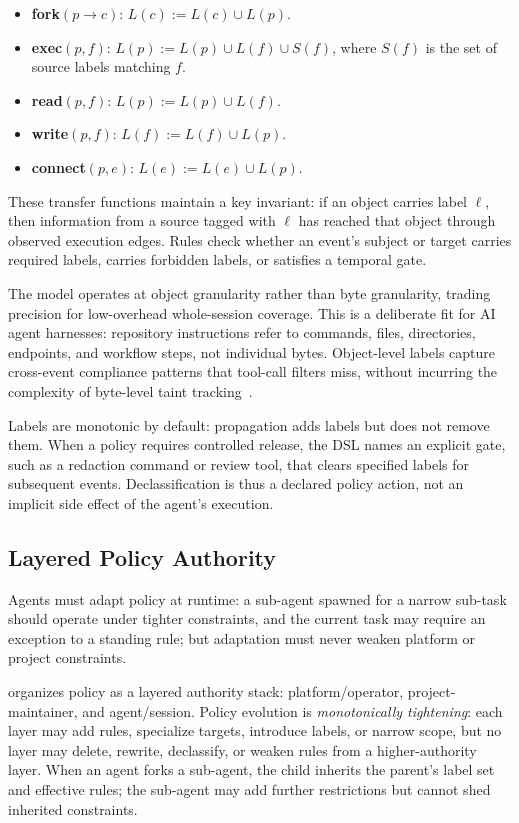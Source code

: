 \begin{itemize}
\item \textbf{fork}$(p \to c)$: $L(c) := L(c) \cup L(p)$.
\item \textbf{exec}$(p, f)$: $L(p) := L(p) \cup L(f) \cup S(f)$, where
$S(f)$ is the set of source labels matching $f$.
\item \textbf{read}$(p, f)$: $L(p) := L(p) \cup L(f)$.
\item \textbf{write}$(p, f)$: $L(f) := L(f) \cup L(p)$.
\item \textbf{connect}$(p, e)$: $L(e) := L(e) \cup L(p)$.
\end{itemize}

These transfer functions maintain a key invariant: if an object carries
label $\ell$, then information from a source tagged with $\ell$ has
reached that object through observed execution edges. Rules check whether
an event's subject or target carries required labels, carries forbidden
labels, or satisfies a temporal gate.

The model operates at object granularity rather than byte granularity,
trading precision for low-overhead whole-session coverage. This is a
deliberate fit for AI agent harnesses: repository instructions refer to
commands, files, directories, endpoints, and workflow steps, not
individual bytes. Object-level labels capture cross-event compliance
patterns that tool-call filters miss, without incurring the complexity of
byte-level taint tracking~\cite{kemerlis2012libdft}.

Labels are monotonic by default: propagation adds labels but does not
remove them. When a policy requires controlled release, the DSL names an
explicit gate, such as a redaction command or review tool, that clears specified
labels for subsequent events. Declassification is thus a declared policy
action, not an implicit side effect of the agent's execution.

\subsection{Layered Policy Authority}
\label{sec:authority}

Agents must adapt policy at runtime: a sub-agent spawned for a narrow
sub-task should operate under tighter constraints, and the current task
may require an exception to a standing rule; but adaptation must never
weaken platform or project constraints.

\sys{} organizes policy as a layered authority stack:
platform/operator, project-maintainer, and agent/session. Policy
evolution is \emph{monotonically tightening}: each layer may add rules,
specialize targets, introduce labels, or narrow scope, but no layer may
delete, rewrite, declassify, or weaken rules from a higher-authority
layer. When an agent forks a sub-agent, the child inherits the parent's
label set and effective rules; the sub-agent may add further restrictions
but cannot shed inherited constraints.

